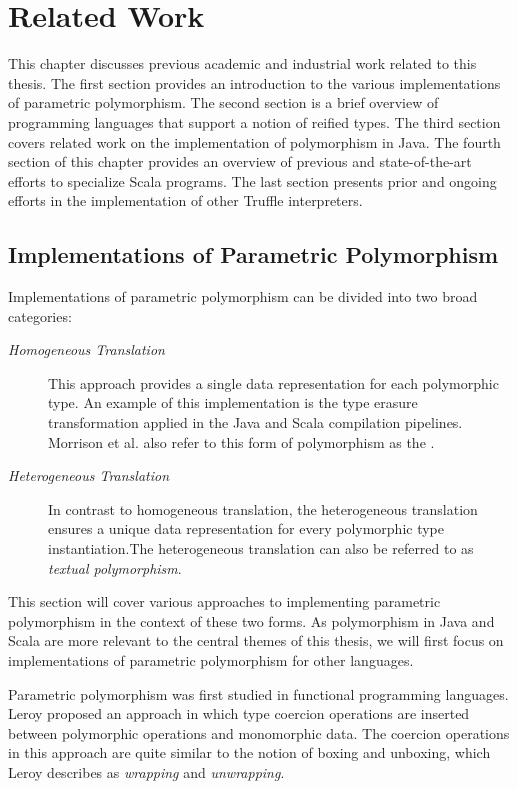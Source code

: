 
\chapter{Related Work}

This chapter discusses previous academic and industrial work related to this thesis. 
The first section provides an introduction to the various implementations of parametric polymorphism.
The second section is a brief overview of programming languages that support a notion of reified types.
The third section covers related work on the implementation of polymorphism in Java.
The fourth section of this chapter provides an overview of previous and state-of-the-art efforts to specialize Scala programs.
The last section presents prior and ongoing efforts in the implementation of other Truffle interpreters.

\section{Implementations of Parametric Polymorphism}

Implementations of parametric polymorphism can be divided into two broad categories\cite{java:odersky-type-params}:

\begin{description}
	\item[\textit{Homogeneous Translation}] 
	This approach provides a single data representation for each polymorphic type. 
	An example of this implementation is the type erasure transformation applied in the Java and Scala compilation pipelines.
	Morrison et al. also refer to this form of polymorphism as the \cite{types-of-polymorphism}.
	\item[\textit{Heterogeneous Translation}]
	In contrast to homogeneous translation, the heterogeneous translation ensures a unique data representation for every polymorphic type instantiation.The heterogeneous translation can also be referred to as \textit{textual polymorphism}.
\end{description}

This section will cover various approaches to implementing parametric polymorphism in the context of these two forms.
As polymorphism in Java and Scala are more relevant to the central themes of this thesis, we will first focus on implementations of parametric polymorphism for other languages.

Parametric polymorphism was first studied in functional programming languages\cite{ml:parametric-polymorphism,ml:type-inference}.
Leroy proposed an approach in which type coercion operations are inserted between polymorphic operations and monomorphic data. 
The coercion operations in this approach are quite similar to the notion of boxing and unboxing, which Leroy describes as \textit{wrapping} and \textit{unwrapping}.

